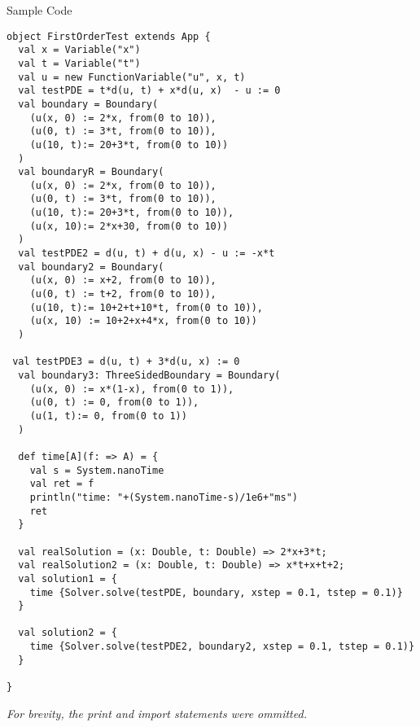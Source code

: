 \noindent Sample Code
\begin{verbatim}
object FirstOrderTest extends App {
  val x = Variable("x")
  val t = Variable("t")
  val u = new FunctionVariable("u", x, t)
  val testPDE = t*d(u, t) + x*d(u, x)  - u := 0
  val boundary = Boundary(
    (u(x, 0) := 2*x, from(0 to 10)),
    (u(0, t) := 3*t, from(0 to 10)),
    (u(10, t):= 20+3*t, from(0 to 10))
  )
  val boundaryR = Boundary(
    (u(x, 0) := 2*x, from(0 to 10)),
    (u(0, t) := 3*t, from(0 to 10)),
    (u(10, t):= 20+3*t, from(0 to 10)),
    (u(x, 10):= 2*x+30, from(0 to 10))
  )
  val testPDE2 = d(u, t) + d(u, x) - u := -x*t
  val boundary2 = Boundary(
    (u(x, 0) := x+2, from(0 to 10)),
    (u(0, t) := t+2, from(0 to 10)),
    (u(10, t):= 10+2+t+10*t, from(0 to 10)),
    (u(x, 10) := 10+2+x+4*x, from(0 to 10))
  )

 val testPDE3 = d(u, t) + 3*d(u, x) := 0
  val boundary3: ThreeSidedBoundary = Boundary(
    (u(x, 0) := x*(1-x), from(0 to 1)),
    (u(0, t) := 0, from(0 to 1)),
    (u(1, t):= 0, from(0 to 1))
  )

  def time[A](f: => A) = {
    val s = System.nanoTime
    val ret = f
    println("time: "+(System.nanoTime-s)/1e6+"ms")
    ret
  }

  val realSolution = (x: Double, t: Double) => 2*x+3*t;
  val realSolution2 = (x: Double, t: Double) => x*t+x+t+2;
  val solution1 = {
    time {Solver.solve(testPDE, boundary, xstep = 0.1, tstep = 0.1)}
  }

  val solution2 = {
    time {Solver.solve(testPDE2, boundary2, xstep = 0.1, tstep = 0.1)}
  }

}
\end{verbatim}
\emph{For brevity, the print and import statements were ommitted.}

